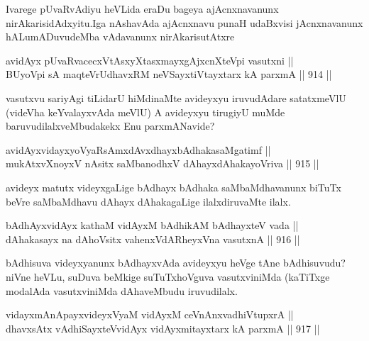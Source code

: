 \begin{artha}
Ivarege pUvaRvAdiyu heVLida eraDu bageya ajAcnxnavanunx nirAkarisidAdxyitu.Iga nAshavAda ajAcnxnavu  punaH udaBxvisi jAcnxnavanunx hALumADuvudeMba vAdavanunx nirAkarisutAtxre\ndash 
\end{artha}

\begin{shl}
avidAyx pUvaRvacecxVtAsxyXtasxmayxgAjxcnXteV\s pi vasutxni || \\
BUyoV\s pi sA maqteVrUdhavxRM neVSayxtiVtayxtarx kA parxmA \hfill || 914 ||  
\end{shl}

\begin{artha}
vasutxvu sariyAgi tiLidarU hiMdinaMte avideyxyu iruvudAdare satatxmeVlU (videVha keYvalayxvAda meVlU) A avideyxyu tirugiyU muMde baruvudilalxveMbudakekx Enu parxmANavide?
\end{artha}

\begin{shl}
avidAyxvidayxyoVyaRsAmxdAvxdhayxbAdhakasaMgatimf || \\
mukAtxvX\s noyxV nAsitx saMbanodhxV dAhayxdAhakayoVriva \hfill || 915 || 
\end{shl}

\begin{artha}
avideyx matutx videyxgaLige bAdhayx bAdhaka saMbaMdhavanunx biTuTx beVre saMbaMdhavu dAhayx dAhakagaLige ilalxdiruvaMte ilalx.
\end{artha}


\begin{shl}
bAdhAyx\s vidAyx kathaM vidAyxM bAdhikAM bAdhayxteV vada ||  \\
dAhakasayx na dAhoV\s sitx vahenxVdARheyxVna vasutxnA \hfill || 916 ||  
\end{shl}

\begin{artha}
bAdhisuva videyxyanunx bAdhayxvAda avideyxyu heVge tAne bAdhisuvudu? niVne heVLu, suDuva beMkige suTuTxhoVguva vasutxviniMda (kaTiTxge modalAda vasutxviniMda dAhaveMbudu iruvudilalx.
\end{artha}


\begin{shl}
vidayxmAnA\s payxvideyxVyaM vidAyxM ceVnAnxvadhiVtupxrA || \\
dhavxsAtx vAdhiSayxteV\s vidAyx vidAyxmitayxtarx kA parxmA \hfill || 917 ||  
\end{shl}

